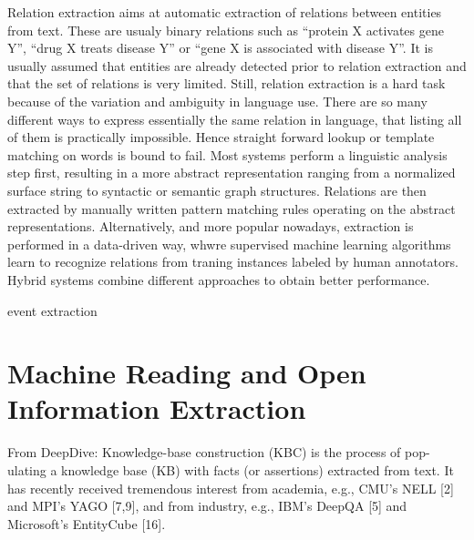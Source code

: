 Relation extraction aims at automatic extraction of relations between entities from text.
These are usualy binary relations such as ``protein X activates gene Y'', ``drug X treats disease Y'' or ``gene X is associated with disease Y''.
It is usually assumed that entities are already detected prior to relation extraction and that the set of relations is very limited.
Still, relation extraction is a hard task because of the variation and ambiguity in language use.
There are so many different ways to express essentially the same relation in language, that listing all of them is practically impossible.
Hence straight forward lookup or template matching on words is bound to fail.
Most systems perform a linguistic analysis step first, resulting in a more abstract representation ranging from a normalized surface string to syntactic or semantic graph structures. 
Relations are then extracted by manually written pattern matching rules operating on the abstract representations.
Alternatively, and more popular nowadays, extraction is performed in a data-driven way, whwre supervised machine learning algorithms learn to recognize relations from traning instances labeled by human annotators.
Hybrid systems combine different approaches to obtain better performance.
 

event extraction


\section{Machine Reading and Open Information Extraction}


\citet{Etzioni2011Search}

From DeepDive:
Knowledge-base construction (KBC) is the process of pop-
ulating a knowledge base (KB) with facts (or assertions)
extracted from text. It has recently received tremendous
interest from academia, e.g., CMU's NELL [2] and MPI's
YAGO [7,9], and from industry, e.g., IBM's DeepQA [5] and
Microsoft's EntityCube [16]. 




